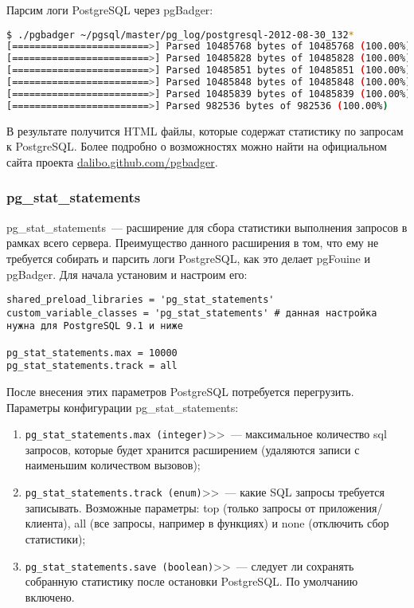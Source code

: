 Парсим логи PostgreSQL через pgBadger:

\begin{lstlisting}[language=Bash,label=lst:sql_performance11,caption=Запуск pgBadger]
$ ./pgbadger ~/pgsql/master/pg_log/postgresql-2012-08-30_132*
[========================>] Parsed 10485768 bytes of 10485768 (100.00%)
[========================>] Parsed 10485828 bytes of 10485828 (100.00%)
[========================>] Parsed 10485851 bytes of 10485851 (100.00%)
[========================>] Parsed 10485848 bytes of 10485848 (100.00%)
[========================>] Parsed 10485839 bytes of 10485839 (100.00%)
[========================>] Parsed 982536 bytes of 982536 (100.00%)
\end{lstlisting}

В результате получится HTML файлы, которые содержат статистику по запросам к PostgreSQL. Более подробно о возможностях можно найти на официальном сайта проекта \href{http://dalibo.github.com/pgbadger/}{dalibo.github.com/pgbadger}.

\subsubsection{pg\_stat\_statements}

pg\_stat\_statements~--- расширение для сбора статистики выполнения запросов в рамках всего сервера. Преимущество данного расширения в том, что ему не требуется собирать и парсить логи PostgreSQL, как это делает pgFouine и pgBadger. Для начала установим и настроим его:

\begin{lstlisting}[label=lst:sql_performance12,caption=Настройка pg\_stat\_statements в postgresql.conf]
shared_preload_libraries = 'pg_stat_statements'
custom_variable_classes = 'pg_stat_statements' # данная настройка нужна для PostgreSQL 9.1 и ниже

pg_stat_statements.max = 10000
pg_stat_statements.track = all
\end{lstlisting}

После внесения этих параметров PostgreSQL потребуется перегрузить. Параметры конфигурации pg\_stat\_statements:

\begin{enumerate}
  \item \lstinline!pg_stat_statements.max (integer)!>>~--- максимальное количество sql запросов, которые будет хранится расширением (удаляются записи с наименьшим количеством вызовов);
  \item \lstinline!pg_stat_statements.track (enum)!>>~--- какие SQL запросы требуется записывать. Возможные параметры: top (только запросы от приложения/клиента), all (все запросы, например в функциях) и none (отключить сбор статистики);
  \item \lstinline!pg_stat_statements.save (boolean)!>>~--- следует ли сохранять собранную статистику после остановки PostgreSQL. По умолчанию включено.
\end{enumerate}

